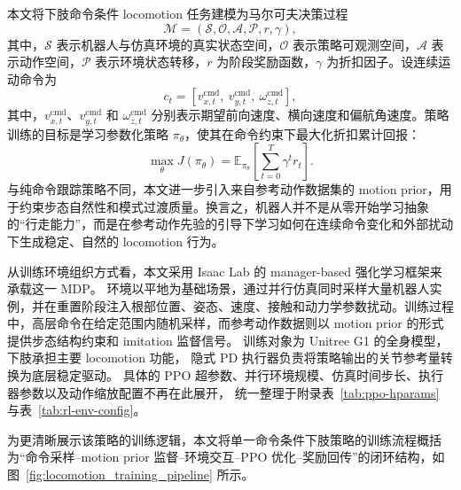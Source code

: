 本文将下肢命令条件 locomotion 任务建模为马尔可夫决策过程
\begin{equation}
\mathcal{M} = (\mathcal{S}, \mathcal{O}, \mathcal{A}, \mathcal{P}, r, \gamma),
\end{equation}
其中，$\mathcal{S}$ 表示机器人与仿真环境的真实状态空间，$\mathcal{O}$ 表示策略可观测空间，$\mathcal{A}$ 表示动作空间，$\mathcal{P}$ 表示环境状态转移，$r$ 为阶段奖励函数，$\gamma$ 为折扣因子。设连续运动命令为
\begin{equation}
c_t = \left[v_{x,t}^{\mathrm{cmd}},\ v_{y,t}^{\mathrm{cmd}},\ \omega_{z,t}^{\mathrm{cmd}}\right],
\end{equation}
其中，$v_{x,t}^{\mathrm{cmd}}$、$v_{y,t}^{\mathrm{cmd}}$ 和 $\omega_{z,t}^{\mathrm{cmd}}$ 分别表示期望前向速度、横向速度和偏航角速度。策略训练的目标是学习参数化策略 $\pi_{\theta}$，使其在命令约束下最大化折扣累计回报：
\begin{equation}
\max_{\theta} J(\pi_{\theta}) = \mathbb{E}_{\pi_{\theta}}\left[\sum_{t=0}^{T}\gamma^t r_t\right].
\end{equation}
与纯命令跟踪策略不同，本文进一步引入来自参考动作数据集的 motion prior，用于约束步态自然性和模式过渡质量。换言之，机器人并不是从零开始学习抽象的“行走能力”，而是在参考动作先验的引导下学习如何在连续命令变化和外部扰动下生成稳定、自然的 locomotion 行为。

从训练环境组织方式看，本文采用 Isaac Lab 的 manager-based 强化学习框架来承载这一 MDP。
环境以平地为基础场景，通过并行仿真同时采样大量机器人实例，并在重置阶段注入根部位置、姿态、速度、接触和动力学参数扰动。训练过程中，高层命令在给定范围内随机采样，而参考动作数据则以 motion prior 的形式提供步态结构约束和 imitation 监督信号。
训练对象为 Unitree G1 的全身模型，下肢承担主要 locomotion 功能，
隐式 PD 执行器负责将策略输出的关节参考量转换为底层稳定驱动。
具体的 PPO 超参数、并行环境规模、仿真时间步长、执行器参数以及动作缩放配置不再在此展开，
统一整理于附录表~\ref{tab:ppo-hparams} 与表~\ref{tab:rl-env-config}。

为更清晰展示该策略的训练逻辑，本文将单一命令条件下肢策略的训练流程概括为“命令采样--motion prior 监督--环境交互--PPO 优化--奖励回传”的闭环结构，如图~\ref{fig:locomotion_training_pipeline} 所示。

